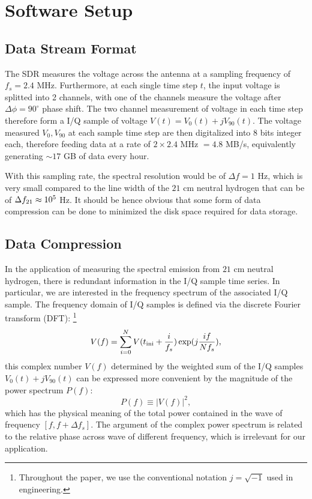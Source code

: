 \documentclass[12pt]{article}
\begin{document}
    \section{Software Setup} \label{sect: software-overview}
    \subsection{Data Stream Format}
    The SDR measures the voltage across the antenna at a sampling frequency of $f_s = 2.4$ MHz. Furthermore, at each single time step $t$, the input voltage is splitted into 2 channels, with one of the channels measure the voltage after $\Delta \phi = 90^\circ$ phase shift.
    The two channel measurement of voltage in each time step therefore form a I/Q sample of voltage $V(t) = V_0(t) + j V_{90}(t)$. 
    The voltage measured $V_0, V_{90}$ at each sample time step are then digitalized into $8$ bits integer each, therefore feeding data at a rate of $2 \times 2.4$ MHz $= 4.8 $ MB/s, equivalently generating $\sim 17$ GB of data every hour. 

    With this sampling rate, the spectral resolution would be of $\Delta f = 1$ Hz, which is very small compared to the line width of the $21$ cm neutral hydrogen that can be of $\Delta f_{\rm 21} \approx 10^5$ Hz. 
    It should be hence obvious that some form of data compression can be done to minimized the disk space required for data storage.
    \subsection{Data Compression}
    In the application of measuring the spectral emission from $21$ cm neutral hydrogen, there is redundant information in the I/Q sample time series. 
    In particular, we are interested in the frequency spectrum of the associated I/Q sample. 
    The frequency domain of I/Q samples is defined via the discrete Fourier transform (DFT): \footnote{Throughout the paper, we use the conventional notation $j=\sqrt{-1}$ used in engineering.}
    \begin{equation} \label{eq: fourier-mode}
        V(f) = \sum_{i=0}^N V(t_{\rm ini} + \frac{i}{f_{s}}) \exp({j\frac{if}{N f_s}}),
    \end{equation}
    this complex number $V(f)$ determined by the weighted sum of the I/Q samples $V_0(t) + j V_{90}(t)$ can be expressed more convenient by the magnitude of the power spectrum $P(f)$:
    \begin{equation}
        P(f) \equiv | V(f) |^2 ,
    \end{equation}
    which has the physical meaning of the total power contained in the wave of frequency $[f, f+\Delta f_s]$.   
    The argument of the complex power spectrum is related to the relative phase across wave of different frequency, which is irrelevant for our application. 
\end{document}
